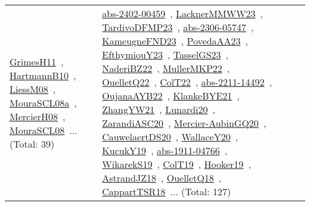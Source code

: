{\begin{longtable}{lp{3cm}>{\raggedright\arraybackslash}p{6cm}>{\raggedright\arraybackslash}p{6cm}>{\raggedright\arraybackslash}p{8cm}}
\href{works/GrimesH11.pdf}{GrimesH11}~\cite{GrimesH11}, \href{works/HartmannB10.pdf}{HartmannB10}~\cite{HartmannB10}, \href{works/LiessM08.pdf}{LiessM08}~\cite{LiessM08}, \href{works/MouraSCL08a.pdf}{MouraSCL08a}~\cite{MouraSCL08a}, \href{works/MercierH08.pdf}{MercierH08}~\cite{MercierH08}, \href{works/MouraSCL08.pdf}{MouraSCL08}~\cite{MouraSCL08}... (Total: 39) & \href{works/abs-2402-00459.pdf}{abs-2402-00459}~\cite{abs-2402-00459}, \href{works/LacknerMMWW23.pdf}{LacknerMMWW23}~\cite{LacknerMMWW23}, \href{works/TardivoDFMP23.pdf}{TardivoDFMP23}~\cite{TardivoDFMP23}, \href{works/abs-2306-05747.pdf}{abs-2306-05747}~\cite{abs-2306-05747}, \href{works/KameugneFND23.pdf}{KameugneFND23}~\cite{KameugneFND23}, \href{works/PovedaAA23.pdf}{PovedaAA23}~\cite{PovedaAA23}, \href{works/EfthymiouY23.pdf}{EfthymiouY23}~\cite{EfthymiouY23}, \href{works/TasselGS23.pdf}{TasselGS23}~\cite{TasselGS23}, \href{works/NaderiBZ22.pdf}{NaderiBZ22}~\cite{NaderiBZ22}, \href{works/MullerMKP22.pdf}{MullerMKP22}~\cite{MullerMKP22}, \href{works/OuelletQ22.pdf}{OuelletQ22}~\cite{OuelletQ22}, \href{works/ColT22.pdf}{ColT22}~\cite{ColT22}, \href{works/abs-2211-14492.pdf}{abs-2211-14492}~\cite{abs-2211-14492}, \href{works/OujanaAYB22.pdf}{OujanaAYB22}~\cite{OujanaAYB22}, \href{works/KlankeBYE21.pdf}{KlankeBYE21}~\cite{KlankeBYE21}, \href{works/ZhangYW21.pdf}{ZhangYW21}~\cite{ZhangYW21}, \href{works/Lunardi20.pdf}{Lunardi20}~\cite{Lunardi20}, \href{works/ZarandiASC20.pdf}{ZarandiASC20}~\cite{ZarandiASC20}, \href{works/Mercier-AubinGQ20.pdf}{Mercier-AubinGQ20}~\cite{Mercier-AubinGQ20}, \href{works/CauwelaertDS20.pdf}{CauwelaertDS20}~\cite{CauwelaertDS20}, \href{works/WallaceY20.pdf}{WallaceY20}~\cite{WallaceY20}, \href{works/KucukY19.pdf}{KucukY19}~\cite{KucukY19}, \href{works/abs-1911-04766.pdf}{abs-1911-04766}~\cite{abs-1911-04766}, \href{works/WikarekS19.pdf}{WikarekS19}~\cite{WikarekS19}, \href{works/ColT19.pdf}{ColT19}~\cite{ColT19}, \href{works/Hooker19.pdf}{Hooker19}~\cite{Hooker19}, \href{works/AstrandJZ18.pdf}{AstrandJZ18}~\cite{AstrandJZ18}, \href{works/OuelletQ18.pdf}{OuelletQ18}~\cite{OuelletQ18}, \href{works/CappartTSR18.pdf}{CappartTSR18}~\cite{CappartTSR18}... (Total: 127)\\

\end{longtable}}
